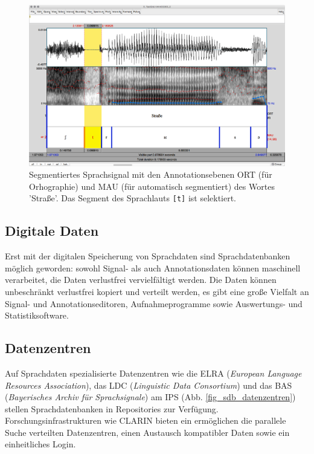 \documentclass[11pt]{book}
\begin{document}
\begin{figure}[htbp]
\begin{center}
\includegraphics[width=1.0\textwidth]{grafiken/sprachdatenbanken/Segmentation}
\caption{Segmentiertes Sprachsignal mit den Annotationsebenen ORT (für Orhographie) und MAU (für automatisch segmentiert) des Wortes 'Straße'. Das Segment des Sprachlauts {\tt [t]} ist selektiert.}
\label{fig_segmentation}
\end{center}
\end{figure}

\subsection*{Digitale Daten}
Erst mit der digitalen Speicherung von Sprachdaten sind Sprachdatenbanken möglich geworden: sowohl Signal- als auch Annotationsdaten können maschinell verarbeitet, die Daten verlustfrei vervielfältigt werden. Die Daten können unbeschränkt verlustfrei kopiert und verteilt werden, es gibt eine große Vielfalt an Signal- und Annotationseditoren, Aufnahmeprogramme sowie Auswertungs- und Statistiksoftware.

\subsection*{Datenzentren}
Auf Sprachdaten spezialisierte Datenzentren wie die ELRA ({\em European Language Resources Association}), das LDC ({\em Linguistic Data Consortium}) und das BAS ({\em Bayerisches Archiv für Sprachsignale}) am IPS (Abb. \ref{fig_sdb_datenzentren}) stellen Sprachdatenbanken in Repositories zur Verfügung. Forschungsinfrastrukturen wie CLARIN bieten ein ermöglichen die parallele Suche verteilten Datenzentren, einen Austausch kompatibler Daten sowie ein einheitliches Login.
\end{document}
